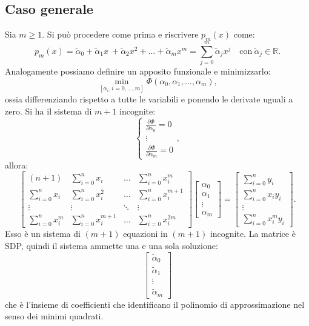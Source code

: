 \subsection{Caso generale}

Sia $m\geqslant 1$. Si può procedere come prima e riscrivere $p_{m}(x)$ come:
\begin{equation*}
p_{m}(x) =\tilde{\alpha }_{0} +\tilde{\alpha }_{1} x\ +\tilde{\alpha }_{2} x^{2} +\dotsc +\tilde{\alpha }_{m} x^{m} =\sum ^{m}_{j=0}\tilde{\alpha }_{j} x^{j} \quad \text{con} \ \tilde{\alpha }_{j} \in \mathbb{R}.
\end{equation*}
Analogamente possiamo definire un apposito funzionale e minimizzarlo:
\begin{equation*}
\min_{[ \alpha _{i} ,i=0,\dotsc ,m]} \Phi ( \alpha _{0} ,\alpha _{1} ,\dotsc ,\alpha _{m}),
\end{equation*}
ossia differenziando rispetto a tutte le variabili e ponendo le derivate uguali a zero.
Si ha il sistema di $m+1$ incognite:
\begin{equation*}
\begin{cases}
\displaystyle\frac{\partial \Phi }{\partial \alpha _{0}} =0\\
\vdots \\
\displaystyle\frac{\partial \Phi }{\partial \alpha _{m}} =0
\end{cases},
\end{equation*}
allora:
\begin{equation*}
\begin{bmatrix}
( n+1) & \sum ^{n}_{i=0} x_{i} & \dotsc  & \sum ^{n}_{i=0} x^{m}_{i}\\
\sum ^{n}_{i=0} x_{i} & \sum ^{n}_{i=0} x^{2}_{i} & \dotsc  & \sum ^{n}_{i=0} x^{m+1}_{i}\\
\vdots  & \vdots  & \ddots  & \vdots \\
\sum ^{n}_{i=0} x^{m}_{i} & \sum ^{n}_{i=0} x^{m+1}_{i} & \dotsc  & \sum ^{n}_{i=0} x^{2m}_{i}
\end{bmatrix}\begin{bmatrix}
\alpha _{0}\\
\alpha _{1}\\
\vdots \\
\alpha _{m}
\end{bmatrix} =\begin{bmatrix}
\sum ^{n}_{i=0} y_{i}\\
\sum ^{n}_{i=0} x_{i} y_{i}\\
\vdots \\
\sum ^{n}_{i=0} x^{m}_{i} y_{i}
\end{bmatrix}.
\end{equation*}
Esso è un sistema di $( m+1)$ equazioni in $( m+1)$ incognite. La matrice è SDP, quindi il sistema ammette una e una sola soluzione:
\begin{equation*}
\begin{bmatrix}
\tilde{\alpha }_{0}\\
\tilde{\alpha }_{1}\\
\vdots \\
\tilde{\alpha }_{m}
\end{bmatrix}
\end{equation*}
che è l'insieme di coefficienti che identificano il polinomio di approssimazione nel senso dei minimi quadrati.